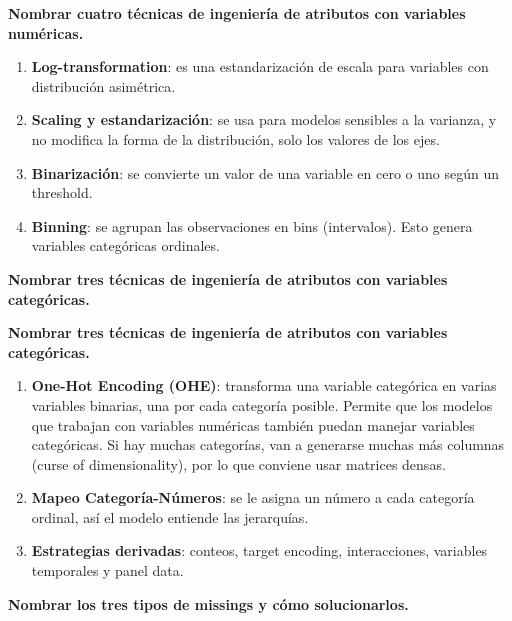 \documentclass[10pt]{memoir}
\begin{document}
\clearpage
\begin{center}
	\textbf{\Large Nombrar cuatro técnicas de ingeniería de atributos con variables numéricas.} \\
\end{center}
\begin{enumerate}
	\item \textbf{Log-transformation}: es una estandarización de escala para variables con distribución asimétrica.
	\item \textbf{Scaling y estandarización}: se usa para modelos sensibles a la varianza, y no modifica la forma de la distribución, solo los valores de los ejes.
	\item \textbf{Binarización}: se convierte un valor de una variable en cero o uno según un threshold.
	\item \textbf{Binning}: se agrupan las observaciones en bins (intervalos). Esto genera variables categóricas ordinales.
\end{enumerate}

\clearpage
\begin{center}
	\textbf{\Large Nombrar tres técnicas de ingeniería de atributos con variables categóricas.} \\
\end{center}

\clearpage
\begin{center}
	\textbf{\Large Nombrar tres técnicas de ingeniería de atributos con variables categóricas.} \\
\end{center}
\begin{enumerate}
	\item \textbf{One-Hot Encoding (OHE)}: transforma una variable categórica en varias variables binarias, una por cada categoría posible. Permite que los modelos que trabajan con variables numéricas también puedan manejar variables categóricas. Si hay muchas categorías, van a generarse muchas más columnas (curse of dimensionality), por lo que conviene usar matrices densas.
	\item \textbf{Mapeo Categoría-Números}: se le asigna un número a cada categoría ordinal, así el modelo entiende las jerarquías.
	\item \textbf{Estrategias derivadas}: conteos, target encoding, interacciones, variables temporales y panel data.
\end{enumerate}

\clearpage
\begin{center}
	\textbf{\Large Nombrar los tres tipos de missings y cómo solucionarlos.} \\
\end{center}
\end{document}
